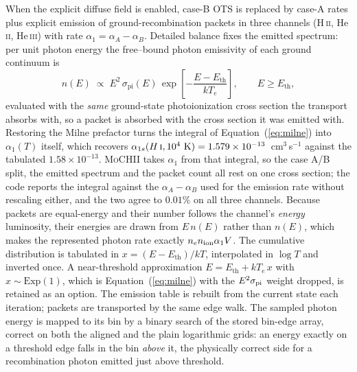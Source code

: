 \documentclass[twocolumn,linenumbers]{aastex702}
\newcommand{\MoCHII}{\textsc{MoCHII}}
\newcommand{\HII}{H\,\textsc{ii}}
\newcommand{\HI}{H\,\textsc{i}}
\newcommand{\HeII}{He\,\textsc{ii}}
\newcommand{\HeIII}{He\,\textsc{iii}}
\begin{document}
When the explicit diffuse field is enabled, case-B OTS is replaced by
case-A rates plus explicit emission of ground-recombination packets in
three channels (\HII, \HeII, \HeIII) with rate $\alpha_1 = \alpha_A -
\alpha_B$.  Detailed balance fixes the emitted spectrum: per unit photon
energy the free--bound photon emissivity of each ground continuum is
\begin{equation}
  n(E) \;\propto\; E^{2}\,\sigma_{\mathrm{pi}}(E)\,
     \exp\!\left[-\frac{E - E_{\mathrm{th}}}{kT_e}\right],
  \qquad E \ge E_{\mathrm{th}},
  \label{eq:milne}
\end{equation}
evaluated with the \emph{same} ground-state photoionization cross section
the transport absorbs with, so a packet is absorbed with the cross section
it was emitted with.  Restoring the Milne prefactor turns the integral of
Equation~(\ref{eq:milne}) into $\alpha_1(T)$ itself, which recovers
$\alpha_{1s}(\HI, 10^4~\mathrm{K}) = 1.579 \times 10^{-13}$~cm$^3$\,s$^{-1}$
against the tabulated $1.58 \times 10^{-13}$.  \MoCHII{} takes $\alpha_1$
from that integral, so the case A/B split, the emitted spectrum and the
packet count all rest on one cross section; the code reports the integral
against the $\alpha_A - \alpha_B$ used for the emission rate without
rescaling either, and the two agree to $0.01$\% on all three channels.
Because packets
are equal-energy and their number follows the channel's \emph{energy}
luminosity, their energies are drawn from $E\,n(E)$ rather than $n(E)$,
which makes the represented photon rate exactly $n_e n_{\rm ion}\alpha_1 V$.
The cumulative distribution is tabulated in $x = (E-E_{\mathrm{th}})/kT$,
interpolated in $\log T$ and inverted once.  A near-threshold approximation
$E = E_{\mathrm{th}} + kT_e\,x$ with $x \sim \mathrm{Exp}(1)$, which is
Equation~(\ref{eq:milne}) with the $E^2\sigma_{\rm pi}$ weight dropped, is
retained as an option.  The emission table is rebuilt from the current state
each iteration; packets are transported by the same edge walk.  The
sampled photon energy is mapped to its bin by a binary search of the
stored bin-edge array, correct on both the aligned and the plain
logarithmic grids: an
energy exactly on a threshold edge falls in the bin \emph{above} it, the
physically correct side for a recombination photon emitted just above
threshold.
\end{document}
